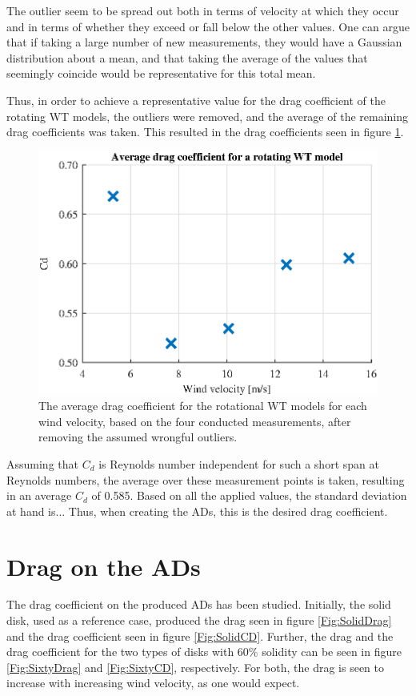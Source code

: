 The outlier seem to be spread out both in terms of velocity at which they occur and in terms of whether they exceed or fall below the other values. One can argue that if taking a large number of new measurements, they would have a Gaussian distribution about a mean, and that taking the average of the values that seemingly coincide would be representative for this total mean. %

Thus, in order to achieve a representative value for the drag coefficient of the rotating WT models, the outliers were removed, and the average of the remaining drag coefficients was taken. This resulted in the drag coefficients seen in figure \ref{fig:RotationalAvg}.

\begin{figure}[h!]
    \centering
    \includegraphics[width=\linewidth]{0_Images/RotationalAverage.eps}
    \caption{The average drag coefficient for the rotational WT models for each wind velocity, based on the four conducted measurements, after removing the assumed wrongful outliers.}
    \label{fig:RotationalAvg}
\end{figure}

Assuming that $C_d$ is Reynolds number independent for such a short span at Reynolds numbers, the average over these measurement points is taken, resulting in an average $C_d$ of 0.585. Based on all the applied values, the standard deviation at hand is... Thus, when creating the ADs, this is the desired drag coefficient. 




\section{Drag on the ADs}
The drag coefficient on the produced ADs has been studied. Initially, the solid disk, used as a reference case, produced the drag seen in figure \ref{Fig:SolidDrag} and the drag coefficient seen in figure \ref{Fig:SolidCD}. Further, the drag and the drag coefficient for the two types of disks with 60\% solidity can be seen in figure \ref{Fig:SixtyDrag} and \ref{Fig:SixtyCD}, respectively. For both, the drag is seen to increase with increasing wind velocity, as one would expect. 



